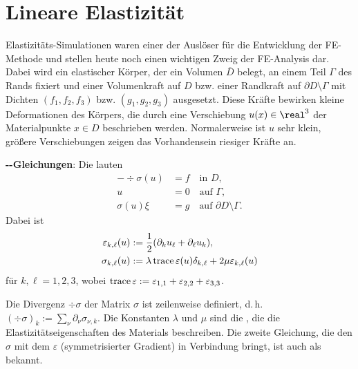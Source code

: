 \pagebreak

\section{%
    Lineare Elastizität%
}

Elastizitäts-Simulationen waren einer der Auslöser für die Entwicklung der FE-Methode und
stellen heute noch einen wichtigen Zweig der FE-Analysis dar.
Dabei wird ein elastischer Körper, der ein Volumen $\overline{D}$ belegt,
an einem Teil $\Gamma$ des Rands fixiert und einer Volumenkraft auf $D$ bzw. einer
Randkraft auf $\partial D \setminus \Gamma$ mit Dichten $(f_1, f_2, f_3)$ bzw.
$(g_1, g_2, g_3)$ ausgesetzt.
Diese Kräfte bewirken kleine Deformationen des Körpers, die durch eine Verschiebung
$u(x) \in \real^3$ der Materialpunkte $x \in D$ beschrieben werden.
Normalerweise ist $u$ sehr klein,
größere Verschiebungen zeigen das Vorhandensein riesiger Kräfte an.

\textbf{--Gleichungen}:
Die  lauten
\begin{align*}
    -\div \sigma(u) &= f \quad\text{in }D,\\
    u &= 0 \quad\text{auf } \Gamma,\\
    \sigma(u) \xi &= g \quad\text{auf } \partial D \setminus \Gamma.
\end{align*}
Dabei ist
\begin{align*}
    \varepsilon_{k,\ell}(u) &:= \frac{1}{2} (\partial_k u_\ell + \partial_\ell u_k),\\
    \sigma_{k,\ell}(u) &:= \lambda \operatorname{trace} \varepsilon(u) \delta_{k,\ell} +
    2\mu \varepsilon_{k,\ell}(u)
\end{align*}
für $k, \ell = 1, 2, 3$, wobei
$\operatorname{trace} \varepsilon := \varepsilon_{1,1} + \varepsilon_{2,2} + \varepsilon_{3,3}$.

Die Divergenz $\div \sigma$ der Matrix $\sigma$ ist zeilenweise definiert, d.\,h.
$(\div \sigma)_k := \sum_\nu \partial_\nu \sigma_{\nu,k}$.
Die Konstanten $\lambda$ und $\mu$ sind die ,
die die Elastizitätseigenschaften des Materials beschreiben.
Die zweite Gleichung, die den  $\sigma$ mit dem
 $\varepsilon$ (symmetrisierter Gradient)
in Verbindung bringt, ist auch als
 bekannt.

\linie

